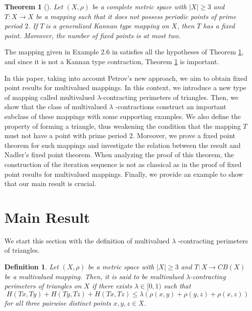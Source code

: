 \documentclass[reqno,11pt]{amsart}
\newtheorem{theorem}{Theorem}
\theoremstyle{plain}
\newtheorem{definition}{Definition}
\numberwithin{equation}{section}
\begin{document}
\begin{theorem}[\protect \cite{PK}]
\label{K1}Let $\left( X,\rho \right) $ be a complete metric space with $%
\left \vert X\right \vert \geq 3$ and $T:X\rightarrow X$ be a mapping such
that it does not possess periodic points of prime period $2$. If $T~$is a
generalized Kannan type mapping on $X$, then $T$ has a fixed point.
Moreover, the number of fixed points is at most two.
\end{theorem}

The mapping given in Example 2.6 in \cite{PK} satisfies all the hypotheses
of Theorem \ref{K1}, and since it is not a Kannan type contraction, Theorem %
\ref{K1} is important.

In this paper, taking into account Petrov's new approach, we aim to obtain
fixed point results for multivalued mappings. In this context, we introduce
a new type of mapping called multivalued $\lambda $-contracting perimeters
of triangles. Then, we show that the class of multivalued $\lambda $%
-contractions construct an important subclass of these mappings with some
supporting examples. We also define the property of forming a triangle, thus
weakening the condition that the mapping $T$ must not have a point with
prime period $2$. Moreover, we prove a fixed point theorem for such mappings
and investigate the relation between the result and Nadler's fixed point
theorem. When analyzing the proof of this theorem, the construction of the
iteration sequence is not as classical as in the proof of fixed point
results for multivalued mappings. Finally, we provide an example to show
that our main result is crucial.

\section{Main Result}

We start this section with the definition of multivalued $\lambda $%
-contracting perimeters of triangles.

\begin{definition}
Let $\left( X,\rho \right) $ be a metric space with $\left \vert
X\right
\vert \geq 3$ and $T:X\rightarrow CB(X)$ be a multivalued mapping.
Then, it is said to be multivalued $\lambda $-contracting perimeters of
triangles on $X$ if there exists $\lambda \in \lbrack 0,1)$ such that 
\begin{equation}
H\left( Tx,Ty\right) +H\left( Ty,Tz\right) +H\left( Tx,Tz\right) \leq
\lambda \left( \rho (x,y)+\rho (y,z)+\rho (x,z)\right)  \label{MLCP}
\end{equation}%
for all three pairwise distinct points $x,y,z\in X$.
\end{definition}
\end{document}
